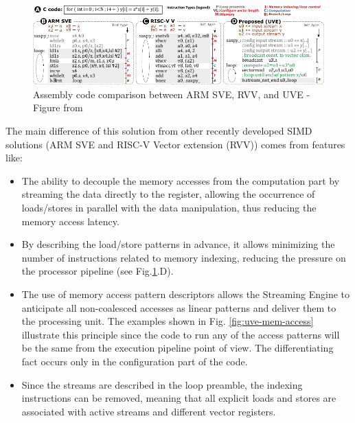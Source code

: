 \begin{figure}[H]
    \centering
    \includegraphics[width=.9\linewidth]{images/UVE-Comparison.pdf}
    \caption{Assembly code comparison between ARM SVE, RVV, and UVE - Figure from \cite{uve-paper}}
    \label{fig:uve-comparison}
\end{figure}

The main difference of this solution from other recently developed SIMD solutions (ARM SVE and RISC-V Vector extension (RVV)) comes from features like:
\begin{itemize}
\item[]   The ability to decouple the memory accesses from the computation part by streaming the data directly to the register, allowing the occurrence of loads/stores in parallel with the data manipulation, thus reducing the memory access latency.


\item[]   By describing the load/store patterns in advance, it allows minimizing the number of instructions related to memory indexing, reducing the pressure on the processor pipeline (see Fig.\ref{fig:uve-comparison}.D). 



\item[]   The use of memory access pattern descriptors allows the Streaming Engine to anticipate all non-coalesced accesses as linear patterns and deliver them to the processing unit. The examples shown in Fig. \ref{fig:uve-mem-access} illustrate this principle since the code to run any of the access patterns will be the same from the execution pipeline point of view. The differentiating fact occurs only in the configuration part of the code.


\item[]   Since the streams are described in the loop preamble, the indexing instructions can be removed, meaning that all explicit loads and stores are associated with active streams and different vector registers.
\end{itemize}

